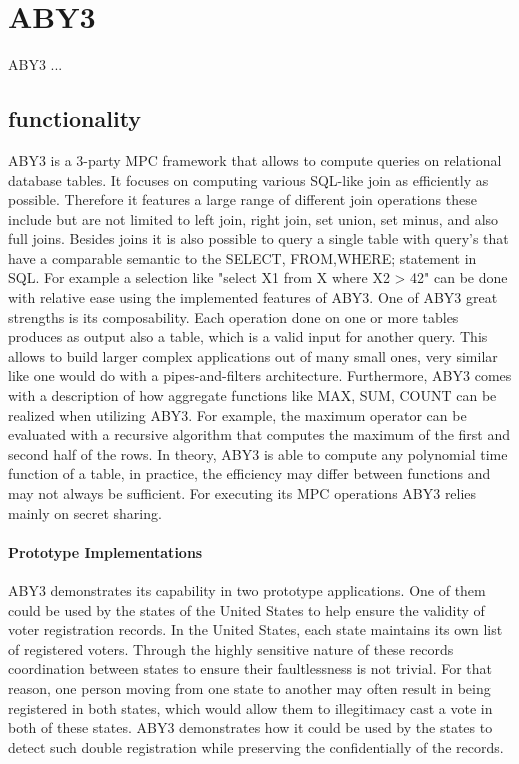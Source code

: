 \section{ABY3}
ABY3 ...
\subsection{functionality }
ABY3 is a 3-party MPC framework that allows to compute queries on relational database tables. It focuses on computing various SQL-like join as efficiently as possible. Therefore it features a large range of different join operations these include but are not limited to left join, right join, set union, set minus, and also full joins.  
Besides joins it is also possible to query a single table with query's that have a comparable semantic to the SELECT, FROM,WHERE; statement in SQL. For example a selection like "select X1 from X  where X2 > 42" can be done with relative ease using the implemented features of ABY3. One of ABY3 great strengths is its composability.
Each operation done on one or more tables produces as output also a table, which is a valid input for another query. This allows to build larger complex applications out of many small ones, very similar like one would do with a pipes-and-filters architecture. 
Furthermore, ABY3 comes with a description of how aggregate functions like MAX, SUM, COUNT can be realized when utilizing ABY3. For example, the maximum operator can be evaluated with a recursive algorithm that computes the maximum of the first and second half of the rows. In theory, ABY3 is able to compute any polynomial time function of a table, in practice, the efficiency may differ between functions and may not always be sufficient.   For executing its MPC operations ABY3 relies mainly on secret sharing.


\paragraph{Prototype Implementations}
ABY3 demonstrates its capability in two prototype applications. One of them could be used by the states of the United States to help ensure the validity of voter registration records. In the United States, each state maintains its own list of registered voters. Through the highly sensitive nature of these records coordination between states to ensure their faultlessness is not trivial. For that reason, one person moving from one state to another may often result in being registered in both states, which would allow them to illegitimacy cast a vote in both of these states.
ABY3 demonstrates how it could be used by the states to detect such double registration while preserving the confidentially of the records. 



